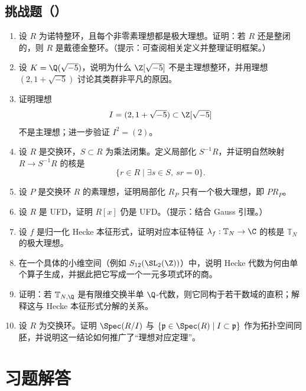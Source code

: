 \subsection*{挑战题（\hard）}

\begin{enumerate}[label=\textbf{9.\arabic*}, leftmargin=*, resume]
  \item \hard 设 $R$ 为诺特整环，且每个非零素理想都是极大理想。证明：若 $R$ 还是整闭的，则 $R$ 是戴德金整环。（提示：可查阅相关定义并整理证明框架。）
  \item \hard 设 $K=\Q(\sqrt{-5})$，说明为什么 $\Z[\sqrt{-5}]$ 不是主理想整环，并用理想 $(2,1+\sqrt{-5})$ 讨论其类群非平凡的原因。
  \item \hard 证明理想
  \[
  I=(2,1+\sqrt{-5})\subset \Z[\sqrt{-5}]
  \]
  不是主理想；进一步验证 $I^2=(2)$。
  \item \hard 设 $R$ 是交换环，$S\subset R$ 为乘法闭集。定义局部化 $S^{-1}R$，并证明自然映射 $R\to S^{-1}R$ 的核是
  \[
  \{r\in R\mid \exists s\in S,\ sr=0\}.
  \]
  \item \hard 设 $P$ 是交换环 $R$ 的素理想，证明局部化 $R_P$ 只有一个极大理想，即 $PR_P$。
  \item \hard 设 $R$ 是 UFD，证明 $R[x]$ 仍是 UFD。（提示：结合 Gauss 引理。）
  \item \hard 设 $f$ 是归一化 Hecke 本征形式，证明对应本征特征 $\lambda_f:\mathbb{T}_N\to \C$ 的核是 $\mathbb{T}_N$ 的极大理想。
  \item \hard 在一个具体的小维空间（例如 $S_{12}(\SL_2(\Z))$）中，说明 Hecke 代数为何由单个算子生成，并据此把它写成一个一元多项式环的商。
  \item \hard 证明：若 $\mathbb{T}_{N,\Q}$ 是有限维交换半单 $\Q$-代数，则它同构于若干数域的直积；解释这与 Hecke 本征形式分解的关系。
  \item \hard 设 $R$ 为交换环。证明 $\Spec(R/I)$ 与 $\{\mathfrak p\in \Spec(R)\mid I\subset \mathfrak p\}$ 作为拓扑空间同胚，并说明这一结论如何推广了“理想对应定理”。
\end{enumerate}

\section*{习题解答}

